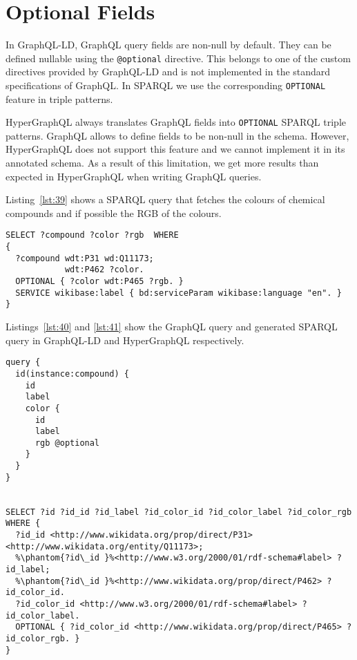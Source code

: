 \section{Optional Fields}

In GraphQL-LD, GraphQL query fields are non-null by default. They can be defined nullable using the \texttt{@optional} directive. This belongs to one of the custom directives provided by GraphQL-LD and is not implemented in the standard specifications of GraphQL. In SPARQL we use the corresponding \texttt{OPTIONAL} feature in triple patterns.

HyperGraphQL always translates GraphQL fields into \texttt{OPTIONAL} SPARQL triple patterns. GraphQL allows to define fields to be non-null in the schema. However, HyperGraphQL does not support this feature and we cannot implement it in its annotated schema. As a result of this limitation, we get more results than expected in HyperGraphQL when writing GraphQL queries. 

Listing~\ref{lst:39} shows a SPARQL query that fetches the colours of chemical compounds and if possible the RGB of the colours.

\begin{minipage}{\linewidth}
\begin{lstlisting}[label=lst:39, caption={SPARQL query showing usage of OPTIONAL feature}, language=SPARQL]
SELECT ?compound ?color ?rgb  WHERE
{
  ?compound wdt:P31 wd:Q11173;
            wdt:P462 ?color.
  OPTIONAL { ?color wdt:P465 ?rgb. }
  SERVICE wikibase:label { bd:serviceParam wikibase:language "en". }
}
\end{lstlisting}
\end{minipage}

Listings~\ref{lst:40} and \ref{lst:41} show the GraphQL query and generated SPARQL query in GraphQL-LD and HyperGraphQL respectively.

\begin{minipage}{\linewidth}
\begin{lstlisting}[columns=fullflexible, label=lst:40, caption={GraphQL query and generated SPARQL query in GraphQL-LD}, language=SPARQL]
query {
  id(instance:compound) {
    id
    label
    color {
      id
      label
      rgb @optional
    }
  }
}


SELECT ?id ?id_id ?id_label ?id_color_id ?id_color_label ?id_color_rgb WHERE {
  ?id_id <http://www.wikidata.org/prop/direct/P31> <http://www.wikidata.org/entity/Q11173>;
  %\phantom{?id\_id }%<http://www.w3.org/2000/01/rdf-schema#label> ?id_label;
  %\phantom{?id\_id }%<http://www.wikidata.org/prop/direct/P462> ?id_color_id.
  ?id_color_id <http://www.w3.org/2000/01/rdf-schema#label> ?id_color_label.
  OPTIONAL { ?id_color_id <http://www.wikidata.org/prop/direct/P465> ?id_color_rgb. }      
}
\end{lstlisting}
\end{minipage}



